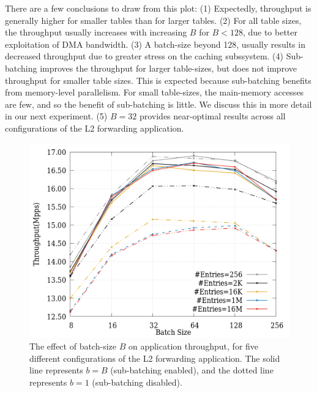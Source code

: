 There are a few conclusions to draw from this plot: (1) Expectedly, throughput is generally higher
for smaller tables than for larger tables. (2) For all table sizes, the throughput usually increases with
increasing $B$ for $B<128$, due to better exploitation of DMA bandwidth. (3) A batch-size beyond 128, usually results in
decreased throughput due to greater stress on the caching subssystem. (4) Sub-batching improves the throughput
for larger table-sizes, but does not improve throughput for smaller table sizes. This is expected
because sub-batching benefits from memory-level parallelism. For small table-sizes, the main-memory
accesses are few, and so the benefit of sub-batching is little. We discuss this in more detail
in our next experiment. (5) $B=32$ provides near-optimal results across all configurations of the
L2 forwarding application.

\begin{figure}[ht]
\includegraphics[width = \linewidth]{Figures/TableSizeVsbatchSize.png}
\caption{The effect of batch-size $B$ on application throughput, for five different configurations of the L2 forwarding application. The solid line represents $b=B$ (sub-batching enabled), and the dotted line represents $b=1$ (sub-batching disabled).}
\label{fig:tablesize}
\end{figure}

